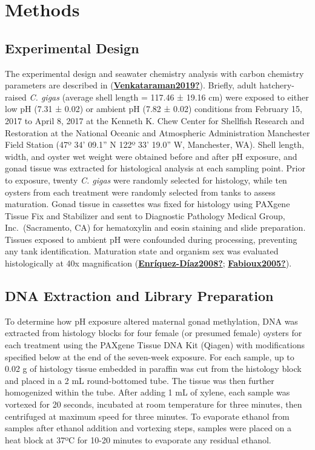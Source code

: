 \documentclass [11pt, proquest] {uwthesis}[2015/03/03]
\begin{document}
\hypertarget{methods-2}{%
\section{Methods}\label{methods-2}}

\hypertarget{experimental-design}{%
\subsection{Experimental Design}\label{experimental-design}}

The experimental design and seawater chemistry analysis with carbon chemistry parameters are described in (\protect\hyperlink{ref-Venkataraman2019}{\textbf{Venkataraman2019?}}). Briefly, adult hatchery-raised \emph{C. gigas} (average shell length = 117.46 ± 19.16 cm) were exposed to either low pH (7.31 ± 0.02) or ambient pH (7.82 ± 0.02) conditions from February 15, 2017 to April 8, 2017 at the Kenneth K. Chew Center for Shellfish Research and Restoration at the National Oceanic and Atmospheric Administration Manchester Field Station (47º 34' 09.1'' N 122º 33' 19.0'' W, Manchester, WA). Shell length, width, and oyster wet weight were obtained before and after pH exposure, and gonad tissue was extracted for histological analysis at each sampling point. Prior to exposure, twenty \emph{C. gigas} were randomly selected for histology, while ten oysters from each treatment were randomly selected from tanks to assess maturation. Gonad tissue in cassettes was fixed for histology using PAXgene Tissue Fix and Stabilizer and sent to Diagnostic Pathology Medical Group, Inc.~(Sacramento, CA) for hematoxylin and eosin staining and slide preparation. Tissues exposed to ambient pH were confounded during processing, preventing any tank identification. Maturation state and organism sex was evaluated histologically at 40x magnification (\protect\hyperlink{ref-Enruxedquez-Duxedaz2008}{\textbf{Enríquez-Díaz2008?}}; \protect\hyperlink{ref-Fabioux2005}{\textbf{Fabioux2005?}}).

\hypertarget{dna-extraction-and-library-preparation}{%
\subsection{DNA Extraction and Library Preparation}\label{dna-extraction-and-library-preparation}}

To determine how pH exposure altered maternal gonad methylation, DNA was extracted from histology blocks for four female (or presumed female) oysters for each treatment using the PAXgene Tissue DNA Kit (Qiagen) with modifications specified below at the end of the seven-week exposure. For each sample, up to 0.02 g of histology tissue embedded in paraffin was cut from the histology block and placed in a 2 mL round-bottomed tube. The tissue was then further homogenized within the tube. After adding 1 mL of xylene, each sample was vortexed for 20 seconds, incubated at room temperature for three minutes, then centrifuged at maximum speed for three minutes. To evaporate ethanol from samples after ethanol addition and vortexing steps, samples were placed on a heat block at 37ºC for 10-20 minutes to evaporate any residual ethanol.
\end{document}
